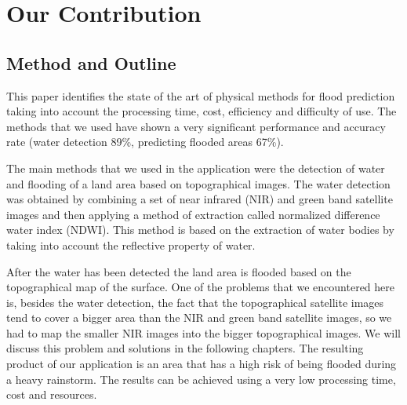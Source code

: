 \documentclass[12pt, a4paper]{report}
\begin{document}
\section{Our Contribution}
\subsection{Method and Outline}

\quad
This paper identifies the state of the art of physical methods for flood prediction taking into account the processing time, cost, efficiency and difficulty of use. The methods that we used have shown a very significant performance and accuracy rate (water detection 89\%, predicting flooded areas 67\%).
\par

The main methods that we used in the application were the detection of water and flooding of a land area based on topographical images. The water detection was obtained by combining a set of near infrared (NIR) and green band satellite images and then applying a method of extraction called normalized difference water index (NDWI). This method is based on the extraction of water bodies by taking into account the reflective property of water.
\par 

After the water has been detected the land area is flooded based on the topographical map of the surface. One of the problems that we encountered here is, besides the water detection, the fact that the topographical satellite images tend to cover a bigger area than the NIR and green band satellite images, so we had to map the smaller NIR images into the bigger topographical images. We will discuss this problem and solutions in the following chapters. The resulting product of our application is an area that has a high risk of being flooded during a heavy rainstorm. The results can be achieved using a very low processing time, cost and resources.
\par 
\end{document}

